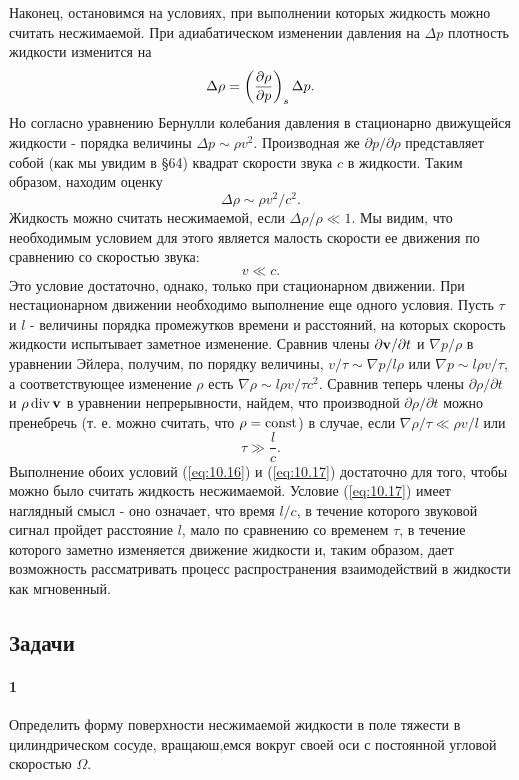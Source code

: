 Наконец, остановимся на условиях, при выполнении которых жидкость можно считать
несжимаемой. При адиабатическом изменении давления на $\Delta p$ плотность
жидкости изменится на
\[
   \Delta \rho = \left( \frac{\partial{\rho}}{\partial{p}} \right)_{s} \Delta p.
\]
Но согласно уравнению Бернулли колебания давления в стационарно движущейся
жидкости - порядка величины $\Delta p \sim \rho v^2$. Производная же
$\partial p/\partial \rho$ представляет собой (как мы увидим в \S64)
квадрат скорости звука $c$ в жидкости. Таким образом, находим оценку
\[
   \Delta \rho \sim \rho v^2/c^2.
\]
Жидкость можно считать несжимаемой, если $\Delta \rho / \rho \ll 1$. Мы видим,
что необходимым условием для этого является малость скорости ее движения по
сравнению со скоростью звука:
\begin{equation}
   \label{eq:10.16}
   v \ll c.
\end{equation}
Это условие достаточно, однако, только при стационарном движении. При
нестационарном движении необходимо выполнение еще одного условия. Пусть $\tau$ и
$l$ - величины порядка промежутков времени и расстояний, на которых скорость
жидкости испытывает заметное изменение. Сравнив члены $\partial { \mathbf{v} } /\partial t$
и $\nabla p/\rho$ в уравнении Эйлера, получим, по порядку величины, $v/\tau \sim
\nabla p /l \rho$ или $\nabla p \sim l \rho v/\tau$, а соответствующее изменение
$\rho$ есть $\nabla \rho \sim l \rho v/ \tau c^2$. Сравнив теперь члены
$\partial \rho / \partial t$ и $\rho \mathop{\mathrm{div}}\nolimits { \mathbf{v} }$ в уравнении непрерывности,
найдем, что производной $\partial \rho / \partial t$ можно пренебречь (т. е.
можно считать, что $\rho = \mathop{\mathrm{const}}\nolimits$) в случае, если $\nabla \rho/\tau \ll \rho
v/l$ или
\begin{equation}
   \label{eq:10.17}
   \tau \gg \frac{l}{c}.
\end{equation}
Выполнение обоих условий (\ref{eq:10.16}) и (\ref{eq:10.17}) достаточно для того, чтобы можно было
считать жидкость несжимаемой. Условие (\ref{eq:10.17}) имеет наглядный смысл - оно
означает, что время $l/c$, в течение которого звуковой сигнал пройдет расстояние
$l$, мало по сравнению со временем $\tau$, в течение которого заметно изменяется
движение жидкости и, таким образом, дает возможность рассматривать процесс
распространения взаимодействий в жидкости как мгновенный.




\subsection*{Задачи}

\paragraph*{1}  Определить форму поверхности несжимаемой жидкости в поле
тяжести в цилиндрическом сосуде, вращаюш,емся вокруг своей оси с постоянной
угловой скоростью $\Omega$.

